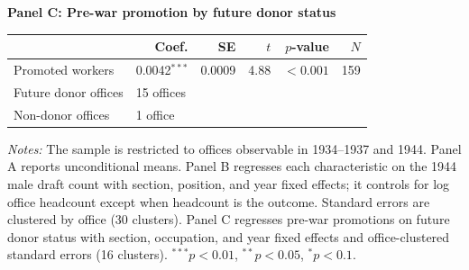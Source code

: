 \begin{table}[htbp]
\begin{threeparttable}
\bigskip
\textbf{Panel C: Pre-war promotion by future donor status}\par\smallskip
\begin{tabular}{lrrrrr}
\toprule
& Coef. & SE & $t$ & $p$-value & $N$\\
\midrule
Promoted workers & 0.0042$^{***}$ & 0.0009 & 4.88 & $<0.001$ & 159\\
\midrule
Future donor offices & \multicolumn{5}{l}{15 offices}\\
Non-donor offices & \multicolumn{5}{l}{1 office}\\
\bottomrule
\end{tabular}
\begin{tablenotes}[flushleft]\footnotesize
\item \textit{Notes:} The sample is restricted to offices observable in 1934--1937 and 1944. Panel A reports unconditional means. Panel B regresses each characteristic on the 1944 male draft count with section, position, and year fixed effects; it controls for log office headcount except when headcount is the outcome. Standard errors are clustered by office (30 clusters). Panel C regresses pre-war promotions on future donor status with section, occupation, and year fixed effects and office-clustered standard errors (16 clusters). $^{***}p<0.01$, $^{**}p<0.05$, $^{*}p<0.1$.
\end{tablenotes}
\end{threeparttable}
\end{table}
